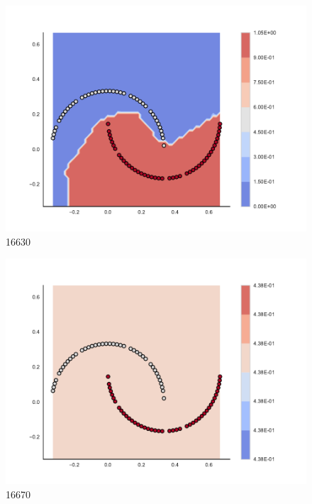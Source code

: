 \begin{subfigure}[b]{0.12\textwidth}
    \includegraphics[clip, trim=2.35cm 1.75cm 4.5cm 0cm,width=\textwidth]{img/convergence/16630.pdf}
    \caption{16630}
    \label{fig:convergence_16630}
\end{subfigure}
%
\begin{subfigure}[b]{0.12\textwidth}
    \includegraphics[clip, trim=2.35cm 1.75cm 4.5cm 0cm,width=\textwidth]{img/convergence/16670.pdf}
    \caption{16670}
    \label{fig:convergence_16670}
\end{subfigure}
%
